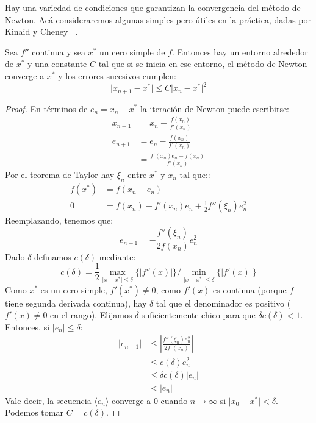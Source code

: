   Hay una variedad de condiciones
  que garantizan la convergencia del método de Newton.
  Acá consideraremos algunas simples pero útiles en la práctica,
  dadas por Kinaid y Cheney~%
    \cite{kincaid02:_numerical_analysis}.
  \begin{theorem}
    \label{theo:Newton-convergence}
    Sea \(f''\) continua y sea \(x^*\) un cero simple de \(f\).
    Entonces hay un entorno alrededor de \(x^*\) y una constante \(C\)
    tal que si se inicia en ese entorno,
    el método de Newton converge a \(x^*\)
    y los errores sucesivos cumplen:
    \begin{equation*}
      \lvert x_{n + 1} - x^* \rvert
        \le C \lvert x_n - x^* \rvert^2
    \end{equation*}
  \end{theorem}
  \begin{proof}
    En términos de \(e_n = x_n - x^*\)
    la iteración de Newton puede escribirse:
    \begin{align*}
      x_{n + 1}
        &= x_n - \frac{f(x_n)}{f'(x_n)} \\
      e_{n + 1}
        &= e_n - \frac{f(x_n)}{f'(x_n)} \\
        &= \frac{f'(x_n) e_n - f(x_n)}{f'(x_n)}
    \end{align*}
    Por el teorema de Taylor hay \(\xi_n\) entre \(x^*\) y \(x_n\) tal que::
    \begin{align*}
      f(x^*)
        &= f(x_n - e_n) \\
      0
        &= f(x_n) - f'(x_n) e_n + \frac{1}{2}f''(\xi_n) e_n^2
    \end{align*}
    Reemplazando,
    tenemos que:
    \begin{equation}
      \label{eq:Newton-error}
      e_{n + 1}
        = - \frac{f''(\xi_n)}{2 f(x_n)} e_n^2
    \end{equation}
    Dado \(\delta\) definamos \(c(\delta)\) mediante:
    \begin{equation*}
      c(\delta)
        = \frac{1}{2}
            \max_{\lvert x - x^* \rvert \le \delta}\{\lvert f''(x) \rvert\}
              / \min_{\lvert x - x^* \rvert \le \delta}\{\lvert f'(x) \rvert\}
    \end{equation*}
    Como \(x^*\) es un cero simple,
    \(f'(x^*) \ne 0\),
    como \(f'(x)\) es continua
    (porque \(f\) tiene segunda derivada continua),
    hay \(\delta\) tal que el denominador es positivo
    (\(f'(x) \ne 0\) en el rango).
    Elijamos \(\delta\) suficientemente chico
    para que \(\delta c(\delta) < 1\).
    Entonces,
    si \(\lvert e_n \rvert \le \delta\):
    \begin{align*}
      \lvert e_{n + 1} \rvert
        &\le \left\lvert \frac{f''(\xi_n) e_n^2}{2 f'(x_n)} \right\rvert \\
        &\le c(\delta) e_n^2 \\
        &\le \delta c(\delta) \lvert e_n \rvert \\
        &<   \lvert e_n \rvert
    \end{align*}
    Vale decir,
    la secuencia \(\langle e_n \rangle\) converge a 0 cuando \(n \to \infty\)
    si \(\lvert x_0 - x^* \rvert < \delta\).
    Podemos tomar \(C = c(\delta)\).
  \end{proof}
